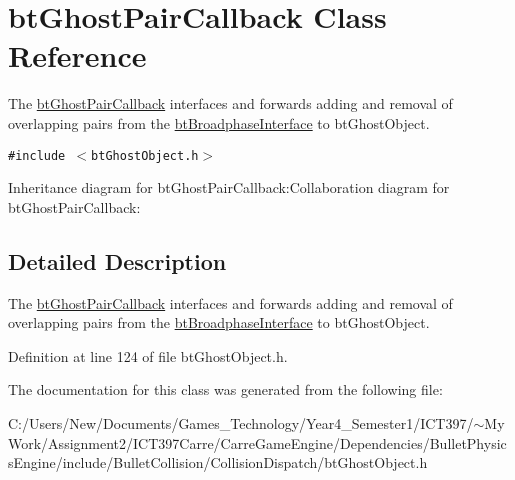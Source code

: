 \hypertarget{classbt_ghost_pair_callback}{
\section{btGhostPairCallback Class Reference}
\label{classbt_ghost_pair_callback}
}
The \hyperlink{classbt_ghost_pair_callback}{btGhostPairCallback} interfaces and forwards adding and removal of overlapping pairs from the \hyperlink{classbt_broadphase_interface}{btBroadphaseInterface} to btGhostObject.  


{\tt \#include $<$btGhostObject.h$>$}

Inheritance diagram for btGhostPairCallback:Collaboration diagram for btGhostPairCallback:

\subsection{Detailed Description}
The \hyperlink{classbt_ghost_pair_callback}{btGhostPairCallback} interfaces and forwards adding and removal of overlapping pairs from the \hyperlink{classbt_broadphase_interface}{btBroadphaseInterface} to btGhostObject. 

Definition at line 124 of file btGhostObject.h.

The documentation for this class was generated from the following file:\begin{CompactItemize}
\item 
C:/Users/New/Documents/Games\_\-Technology/Year4\_\-Semester1/ICT397/$\sim$My Work/Assignment2/ICT397Carre/CarreGameEngine/Dependencies/BulletPhysicsEngine/include/BulletCollision/CollisionDispatch/btGhostObject.h\end{CompactItemize}
